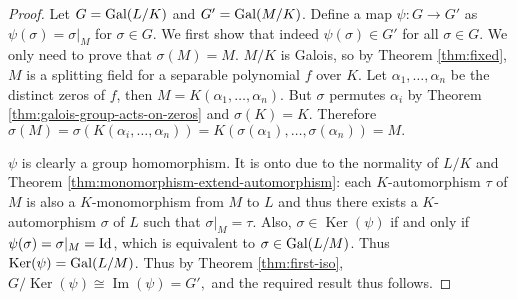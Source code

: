 \begin{proof}
	Let $G = \operatorname{Gal}(L/K)$ and $G' = \operatorname{Gal}(M/K)$. Define a map $\psi: G \to G'$ as $\psi(\sigma) = \sigma | _M$ for $\sigma \in G$. We first show that indeed $\psi(\sigma) \in G'$ for all $\sigma \in G$. We only need to prove that $\sigma(M) = M$. $M/K$ is Galois, so by Theorem \ref{thm:fixed}, $M$ is a splitting field for a separable polynomial $f$ over $K$. Let $\alpha_1, \dots, \alpha_n$ be the distinct zeros of $f$, then $M = K(\alpha_1, \ldots, \alpha_n)$. But $\sigma$ permutes $\alpha_i$ by Theorem \ref{thm:galois-group-acts-on-zeros} and $\sigma(K) = K$. Therefore $\sigma(M) = \sigma(K(\alpha_i, \ldots, \alpha_n)) = K(\sigma(\alpha_1), \ldots, \sigma(\alpha_n)) = M. $
	
	
	 $\psi$ is clearly a group homomorphism. It is onto due to the normality of $L/K$ and Theorem \ref{thm:monomorphism-extend-automorphism}: each $K$-automorphism $\tau$ of $M$ is also a $K$-monomorphism from $M$ to $L$ and thus there exists a $K$-automorphism $\sigma$ of $L$ such that $\sigma | _M = \tau$. Also, $\sigma \in \operatorname{Ker}(\psi)$ if and only if $\psi(\sigma) = \sigma |_M = \operatorname{Id}$, which is equivalent to $\sigma \in \operatorname{Gal}(L/M)$. Thus $\operatorname{Ker}(\psi) = \operatorname{Gal}(L/M)$. Thus by Theorem \ref{thm:first-iso}, 
	$G / \operatorname{Ker}(\psi) \cong \operatorname{Im}(\psi) = G',$
	and the required result thus follows. 
\end{proof}


%	
%    
%    
%


